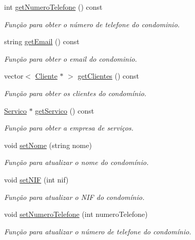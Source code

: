 \begin{DoxyCompactItemize}
int \hyperlink{class_condominio_adc7a4de5ad8ace80c0290fff0619f22d}{get\+Numero\+Telefone} () const 
\begin{DoxyCompactList}\small\item\em Função para obter o número de telefone do condominio. \end{DoxyCompactList}\item 
string \hyperlink{class_condominio_adc4a6fa8a9fcb43a65226b722b7929d0}{get\+Email} () const 
\begin{DoxyCompactList}\small\item\em Função para obter o email do condominio. \end{DoxyCompactList}\item 
vector$<$ \hyperlink{class_cliente}{Cliente} $\ast$ $>$ \hyperlink{class_condominio_a6a9100e8a8a48847785f4c4b108ab8db}{get\+Clientes} () const 
\begin{DoxyCompactList}\small\item\em Função para obter os clientes do condomínio. \end{DoxyCompactList}\item 
\hyperlink{class_servico}{Servico} $\ast$ \hyperlink{class_condominio_abb987c983caf8468935773b00505a5e2}{get\+Servico} () const 
\begin{DoxyCompactList}\small\item\em Função para obter a empresa de serviços. \end{DoxyCompactList}\item 
void \hyperlink{class_condominio_a64353c4a20129888074cdc9526cdc04b}{set\+Nome} (string nome)
\begin{DoxyCompactList}\small\item\em Função para atualizar o nome do condomínio. \end{DoxyCompactList}\item 
void \hyperlink{class_condominio_a89d828306fcbcc0df34d52e07b7e9bb7}{set\+N\+IF} (int nif)
\begin{DoxyCompactList}\small\item\em Função para atualizar o N\+IF do condomínio. \end{DoxyCompactList}\item 
void \hyperlink{class_condominio_a7f454a535fe1ebc3ab244415d963b719}{set\+Numero\+Telefone} (int numero\+Telefone)
\begin{DoxyCompactList}\small\item\em Função para atualizar o número de telefone do condomínio. \end{DoxyCompactList}\item 

\end{DoxyCompactItemize}
